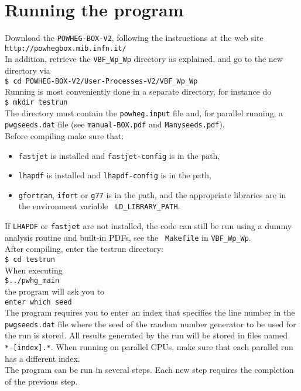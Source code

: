 \documentclass[a4paper,11pt]{article}
\newcommand\POWHEGBOXV{{\tt POWHEG-BOX-V2}}
\begin{document}
\section*{Running the program}
%
Download the \POWHEGBOXV{}, following the instructions at the web site 
\\[2ex]
{\tt http://powhegbox.mib.infn.it/}
\\[2ex] 
In addition, retrieve the {\tt VBF\_Wp\_Wp} directory as explained, 
and go to the new directory via
\\[2ex]
{\tt \$ cd POWHEG-BOX-V2/User-Processes-V2/VBF\_Wp\_Wp}
\\[2ex]
Running is most conveniently done in a separate directory, for instance do
\\[2ex]
{\tt \$ mkdir testrun}
\\[2ex]
The directory must contain the {\tt powheg.input} file and, for
parallel running, a {\tt pwgseeds.dat} file (see {\tt manual-BOX.pdf}
and {\tt Manyseeds.pdf}).
\\[2ex]
Before compiling make sure that:
\begin{itemize}
\item 
{\tt fastjet} is installed and {\tt fastjet-config} is in the path,
\item 
{\tt lhapdf} is installed and {\tt lhapdf-config} is in the path,
\item
{\tt gfortran}, {\tt ifort} or {\tt g77} is in the path, and the
appropriate libraries are in the environment variable {\tt
  LD\_LIBRARY\_PATH}. 
\end{itemize}
%
If {\tt LHAPDF} or {\tt fastjet} are not installed, the code can still
be run using a dummy analysis routine and built-in PDFs, see the {\tt
  Makefile} in {\tt VBF\_Wp\_Wp}.
%
\\[2ex]
After compiling, enter the testrun directory:
\\[2ex]
{\tt \$ cd testrun}
\\[2ex]
When executing
\\[2ex]
{\tt \$../pwhg\_main}
\\[2ex]
the program will ask you to
\\[2ex]
{\tt enter which seed}
\\[2ex]
The program requires you to enter an index that specifies the line
number in the {\tt pwgseeds.dat} file where the seed of the random
number generator to be used for the run is stored. All results
generated by the run will be stored in files named {\tt
  *-[index].*}. When running on parallel CPUs, make sure that each
parallel run has a different index.
\\[2ex]
The program can be run in several steps. Each new step requires the
completion of the previous step.
% 
\end{document}
